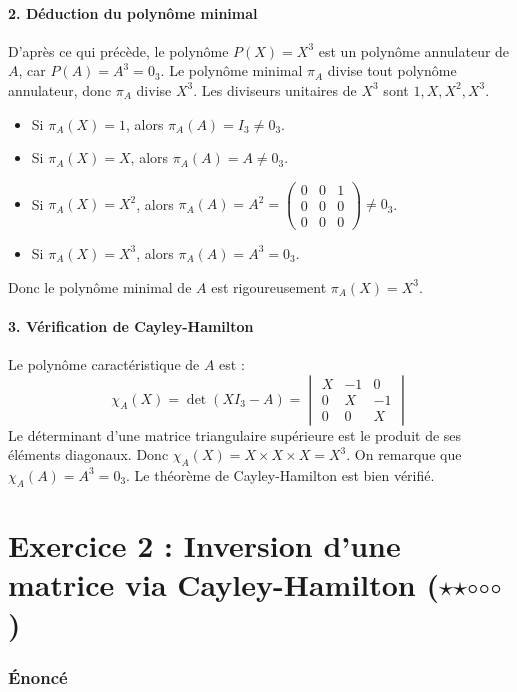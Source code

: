 \documentclass[11pt,a4paper]{article}
\begin{document}
\subsection{2. Déduction du polynôme minimal}
D'après ce qui précède, le polynôme $P(X) = X^3$ est un polynôme annulateur de $A$, car $P(A) = A^3 = 0_3$. Le polynôme minimal $\pi_A$ divise tout polynôme annulateur, donc $\pi_A$ divise $X^3$.
Les diviseurs unitaires de $X^3$ sont $1, X, X^2, X^3$.
\begin{itemize}
\item Si $\pi_A(X) = 1$, alors $\pi_A(A) = I_3 \neq 0_3$.
\item Si $\pi_A(X) = X$, alors $\pi_A(A) = A \neq 0_3$.
\item Si $\pi_A(X) = X^2$, alors $\pi_A(A) = A^2 = \begin{pmatrix} 0 & 0 & 1 \\ 0 & 0 & 0 \\ 0 & 0 & 0 \end{pmatrix} \neq 0_3$.
\item Si $\pi_A(X) = X^3$, alors $\pi_A(A) = A^3 = 0_3$.
\end{itemize}

Donc le polynôme minimal de $A$ est rigoureusement $\pi_A(X) = X^3$.

\subsection{3. Vérification de Cayley-Hamilton}
Le polynôme caractéristique de $A$ est :
$$\chi_A(X) = \det(X I_3 - A) = \begin{vmatrix} X & -1 & 0 \\ 0 & X & -1 \\ 0 & 0 & X \end{vmatrix}$$
Le déterminant d'une matrice triangulaire supérieure est le produit de ses éléments diagonaux.
Donc $\chi_A(X) = X \times X \times X = X^3$.
On remarque que $\chi_A(A) = A^3 = 0_3$.
Le théorème de Cayley-Hamilton est bien vérifié.




\part{Exercice 2 : Inversion d'une matrice via Cayley-Hamilton ($\star$$\star$$\circ$$\circ$$\circ$)}

\section{Énoncé}
\end{document}

